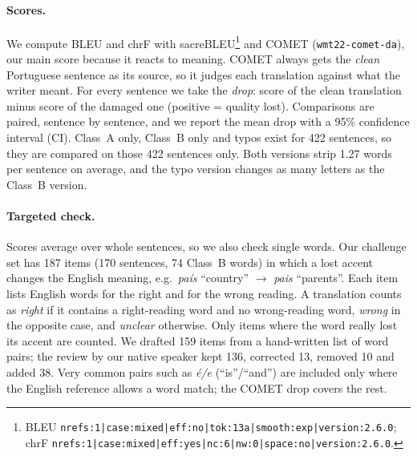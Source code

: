 \paragraph{Scores.} We compute BLEU and chrF with sacreBLEU\footnote{BLEU
\texttt{nrefs:1|case:mixed|eff:no|tok:13a|smooth:exp|version:2.6.0}; chrF
\texttt{nrefs:1|case:mixed|eff:yes|nc:6|nw:0|space:no|version:2.6.0}.} and COMET
(\texttt{wmt22-comet-da}), our main score because it reacts to meaning. COMET always gets the
\emph{clean} Portuguese sentence as its source, so it judges each translation against what the writer
meant. For every sentence we take the \emph{drop}: score of the clean translation minus score of the
damaged one (positive = quality lost). Comparisons are paired, sentence by sentence, and we report
the mean drop with a 95\% confidence interval (CI). Class~A only, Class~B only and typos exist for 422
sentences, so they are compared on those 422 sentences only. Both versions strip 1.27 words per
sentence on average, and the typo version changes as many letters as the Class~B version.

\paragraph{Targeted check.} Scores average over whole sentences, so we also check single words. Our
challenge set has 187 items (170 sentences, 74 Class~B words) in which a lost accent changes the English
meaning, e.g.\ \emph{país} ``country'' $\rightarrow$ \emph{pais} ``parents''. Each item lists English
words for the right and for the wrong reading. A translation counts as \emph{right} if it contains a
right-reading word and no wrong-reading word, \emph{wrong} in the opposite case, and \emph{unclear}
otherwise. Only items where the word really lost its accent are counted. We drafted 159 items from a hand-written list of word pairs; the review by our native speaker kept
136, corrected 13, removed 10 and added 38. Very common pairs such as \emph{é/e} (``is''/``and'') are
included only where the English reference allows a word match; the COMET drop covers the rest.

